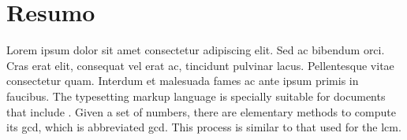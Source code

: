 \documentclass[./main.tex]{subfiles}
\begin{document}
\chapter{Resumo}

\par Lorem ipsum dolor sit amet consectetur adipiscing elit. Sed ac bibendum orci. Cras erat elit, consequat vel erat ac, tincidunt pulvinar lacus. Pellentesque vitae consectetur quam. Interdum et malesuada fames ac ante ipsum primis in faucibus. The typesetting markup language is specially suitable for documents that include . Given a set of numbers, there are elementary methods to compute its \acrlong{gcd}, which is abbreviated \acrshort{gcd}. This process is similar to that used for the \acrfull{lcm}.
\end{document}

